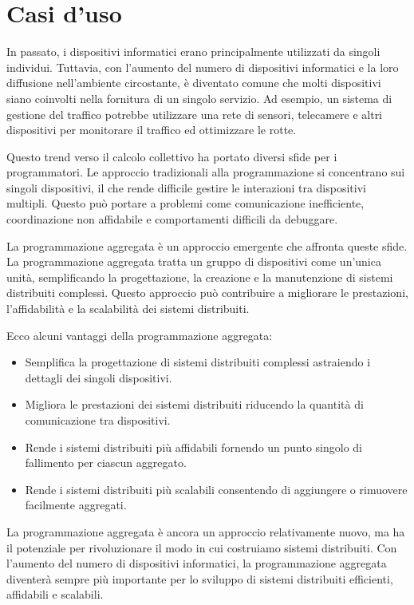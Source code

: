 \section{Casi d'uso}

In passato, i dispositivi informatici erano principalmente utilizzati da singoli individui. Tuttavia, con l'aumento del numero di dispositivi informatici e la loro diffusione nell'ambiente circostante, è diventato comune che molti dispositivi siano coinvolti nella fornitura di un singolo servizio. Ad esempio, un sistema di gestione del traffico potrebbe utilizzare una rete di sensori, telecamere e altri dispositivi per monitorare il traffico ed ottimizzare le rotte.

Questo trend verso il calcolo collettivo ha portato diversi sfide per i programmatori. Le approccio tradizionali alla programmazione si concentrano sui singoli dispositivi, il che rende difficile gestire le interazioni tra dispositivi multipli. Questo può portare a problemi come comunicazione inefficiente, coordinazione non affidabile e comportamenti difficili da debuggare.

La programmazione aggregata è un approccio emergente che affronta queste sfide. La programmazione aggregata tratta un gruppo di dispositivi come un'unica unità, semplificando la progettazione, la creazione e la manutenzione di sistemi distribuiti complessi. Questo approccio può contribuire a migliorare le prestazioni, l'affidabilità e la scalabilità dei sistemi distribuiti.

Ecco alcuni vantaggi della programmazione aggregata:

\begin{itemize}
    \item Semplifica la progettazione di sistemi distribuiti complessi astraiendo i dettagli dei singoli dispositivi.
    \item Migliora le prestazioni dei sistemi distribuiti riducendo la quantità di comunicazione tra dispositivi.
    \item Rende i sistemi distribuiti più affidabili fornendo un punto singolo di fallimento per ciascun aggregato.
    \item Rende i sistemi distribuiti più scalabili consentendo di aggiungere o rimuovere facilmente aggregati.
\end{itemize}

La programmazione aggregata è ancora un approccio relativamente nuovo, ma ha il potenziale per rivoluzionare il modo in cui costruiamo sistemi distribuiti. Con l'aumento del numero di dispositivi informatici, la programmazione aggregata diventerà sempre più importante per lo sviluppo di sistemi distribuiti efficienti, affidabili e scalabili.

